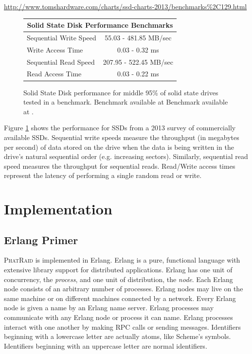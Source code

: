\documentclass[10pt,letter]{article}
\newcommand{\phatraid}[0]{\textsc{PhatRaid}}
\begin{document}
\urldef\hwbenchmark\url{http://www.tomshardware.com/charts/ssd-charts-2013/benchmarks%2C129.html}
\begin{figure}
\centering
\begin{tabular}{l || c}
\multicolumn{2}{c}{{\bf Solid State Disk Performance Benchmarks}} \\ \hline
Sequential Write Speed  \hspace{7em} & 55.03 - 481.85 MB/sec \\ 
Write Access Time & 0.03 - 0.32 ms \\ \hline
Sequential Read Speed &  207.95 - 522.45 MB/sec \\
Read Access Time & 0.03 - 0.22 ms \\ \hline
\end{tabular}
\caption[Solid State Performance]{Solid State Disk performance for middle 95\% of solid state drives tested in a benchmark. Benchmark available at Benchmark available at \hwbenchmark.}
\label{fig:ssd-perf}
\end{figure}

Figure \ref{fig:ssd-perf} shows the performance for SSDs from a 2013 survey of commercially available SSDs. Sequential write speeds measure the throughput (in megabytes per second) of data stored on the drive when the data is being written in the drive's natural sequential order (e.g. increasing sectors). Similarly, sequential read speed measures the throughput for sequential reads. Read/Write access times represent the latency of performing a single random read or write. 

\section{Implementation}

\subsection{Erlang Primer}

\phatraid{} is implemented in Erlang. Erlang is a pure, functional language with
extensive library support for distributed applications. Erlang has one unit of
concurrency, the \emph{process}, and one unit of distribution, the
\emph{node}. Each Erlang node consists of an arbitrary number of
processes. Erlang nodes may live on the same machine or on different machines
connected by a network. Every Erlang node is given a name by an Erlang name
server. Erlang processes may communicate with any Erlang node or process it can
name. Erlang processes interact with one another by making RPC calls or sending
messages. Identifiers beginning with a lowercase letter are actually atoms, like
Scheme's symbols. Identifiers beginning with an uppercase letter are normal
identifiers.
\end{document}
